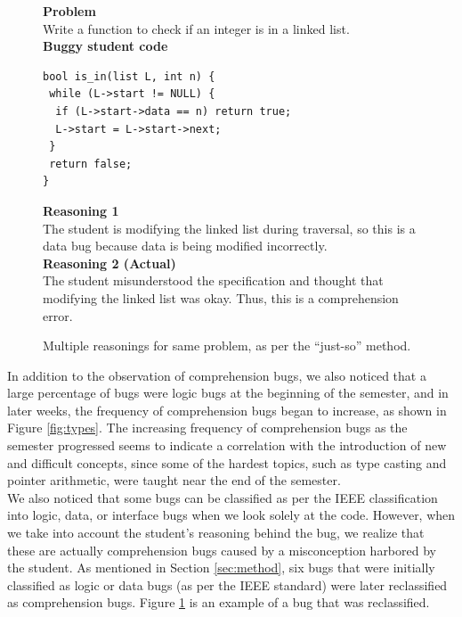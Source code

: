 \documentclass{sig-alternate}
\begin{document}
\begin{figure}
\begin{framed}
\setlength{\parindent}{0cm}
\textbf{Problem}\\
Write a function to check if an integer is in a linked list.\\

\textbf{Buggy student code}
\vspace{-0.05in}
\begin{verbatim}
bool is_in(list L, int n) {
 while (L->start != NULL) {
  if (L->start->data == n) return true;
  L->start = L->start->next;
 }
 return false;
}
\end{verbatim}

\textbf{Reasoning 1}\\
The student is modifying the linked list during traversal, so this is a data bug because data is being modified incorrectly.\\

\textbf{Reasoning 2 (Actual)}\\
The student misunderstood the specification and thought that modifying the linked list was okay. Thus, this is a comprehension error.
\end{framed}
\vspace{-0.1in}
\caption{Multiple reasonings for same problem, as per the ``just-so'' method.}
\label{fig:incorrect}
\end{figure}

In addition to the observation of comprehension bugs, we also noticed that a large percentage of bugs were logic bugs at the beginning of the semester, and in later weeks, the frequency of comprehension bugs began to increase, as shown in Figure \ref{fig:types}. The increasing frequency of comprehension bugs as the semester progressed seems to indicate a correlation with the introduction of new and difficult concepts, since some of the hardest topics, such as type casting and pointer arithmetic, were taught near the end of the semester.\\

We also noticed that some bugs can be classified as per the IEEE classification into logic, data, or interface bugs when we look solely at the code. However, when we take into account the student's reasoning behind the bug, we realize that these are actually comprehension bugs caused by a misconception harbored by the student. As mentioned in Section \ref{sec:method}, six bugs that were initially classified as logic or data bugs (as per the IEEE standard) were later reclassified as comprehension bugs. Figure \ref{fig:incorrect} is an example of a bug that was reclassified.\\
\end{document}
